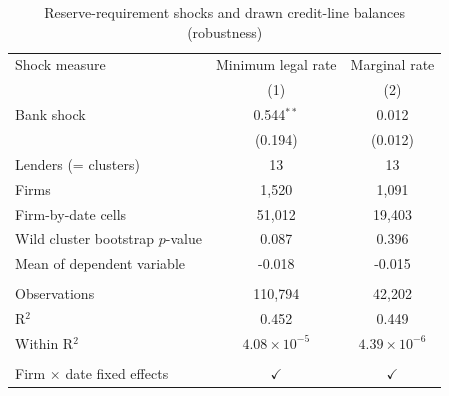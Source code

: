 
\begin{table}[!h]
   \centering
   \small
   \begin{threeparttable}[b]
      \caption{\label{tab:encaje_loan_growth_drawn} Reserve-requirement shocks and drawn credit-line balances (robustness)}
      \bigskip
      \begin{tabular}{lcc}
         \toprule
         Shock measure                     & Minimum legal rate    & Marginal rate \\   
                                           & (1)                   & (2)\\  
         \midrule 
         Bank shock                        & 0.544$^{**}$          & 0.012\\   
                                           & (0.194)               & (0.012)\\   
         Lenders (= clusters)              & 13                    & 13\\  
         Firms                             & 1,520                 & 1,091\\  
         Firm-by-date cells                & 51,012                & 19,403\\  
         Wild cluster bootstrap $p$-value  & 0.087                 & 0.396\\  
         Mean of dependent variable        & -0.018                & -0.015\\  
          \\
         Observations                      & 110,794               & 42,202\\  
         R$^2$                             & 0.452                 & 0.449\\  
         Within R$^2$                      & $4.08\times 10^{-5}$  & $4.39\times 10^{-6}$\\   
          \\
         Firm $\times$ date fixed effects  & $\checkmark$          & $\checkmark$\\   
         \bottomrule
      \end{tabular}
      

\end{threeparttable}
\end{table}
